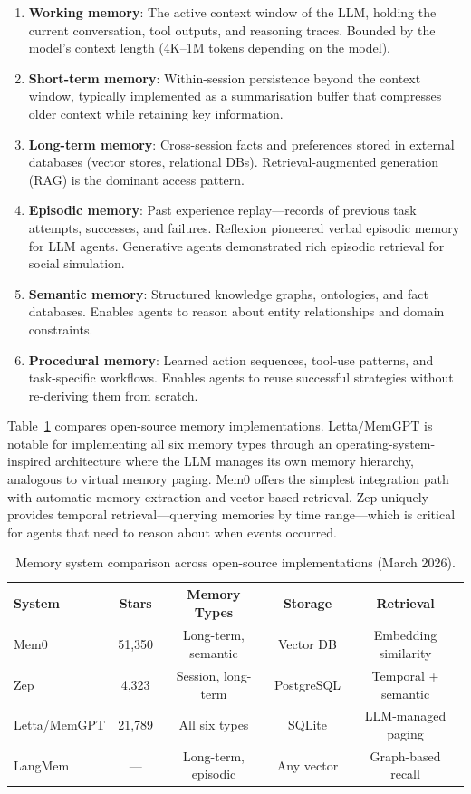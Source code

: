 \documentclass[review]{elsarticle}
\theoremstyle{definition}
\begin{document}
\begin{enumerate}
    \item \textbf{Working memory}: The active context window of the LLM, holding the current conversation, tool outputs, and reasoning traces. Bounded by the model's context length (4K--1M tokens depending on the model).
    \item \textbf{Short-term memory}: Within-session persistence beyond the context window, typically implemented as a summarisation buffer that compresses older context while retaining key information.
    \item \textbf{Long-term memory}: Cross-session facts and preferences stored in external databases (vector stores, relational DBs). Retrieval-augmented generation (RAG) \citep{lewis2020retrieval} is the dominant access pattern.
    \item \textbf{Episodic memory}: Past experience replay---records of previous task attempts, successes, and failures. Reflexion \citep{shinn2023reflexion} pioneered verbal episodic memory for LLM agents. Generative agents \citep{park2023generative} demonstrated rich episodic retrieval for social simulation.
    \item \textbf{Semantic memory}: Structured knowledge graphs, ontologies, and fact databases. Enables agents to reason about entity relationships and domain constraints.
    \item \textbf{Procedural memory}: Learned action sequences, tool-use patterns, and task-specific workflows. Enables agents to reuse successful strategies without re-deriving them from scratch.
\end{enumerate}

Table~\ref{tab:memory} compares open-source memory implementations. Letta/MemGPT \citep{packer2023memgpt} is notable for implementing all six memory types through an operating-system-inspired architecture where the LLM manages its own memory hierarchy, analogous to virtual memory paging. Mem0 \citep{mem0_2024} offers the simplest integration path with automatic memory extraction and vector-based retrieval. Zep \citep{zep2024} uniquely provides temporal retrieval---querying memories by time range---which is critical for agents that need to reason about when events occurred.

\begin{table}[ht]
\centering
\caption{Memory system comparison across open-source implementations (March 2026).}
\label{tab:memory}
\begin{tabular}{lcccc}
\toprule
\textbf{System} & \textbf{Stars} & \textbf{Memory Types} & \textbf{Storage} & \textbf{Retrieval} \\
\midrule
Mem0         & 51,350 & Long-term, semantic  & Vector DB  & Embedding similarity \\
Zep          & 4,323  & Session, long-term   & PostgreSQL & Temporal + semantic \\
Letta/MemGPT & 21,789 & All six types        & SQLite     & LLM-managed paging \\
LangMem      & ---    & Long-term, episodic  & Any vector & Graph-based recall \\
\bottomrule
\end{tabular}
\end{table}
\end{document}
